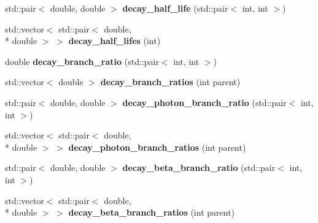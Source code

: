 \begin{DoxyCompactItemize}
\item 
\hypertarget{namespacepyne_acfa39b50f6a8d82e8a651df1f2802c91}{std\-::pair$<$ double, double $>$ {\bfseries decay\-\_\-half\-\_\-life} (std\-::pair$<$ int, int $>$)}\label{namespacepyne_acfa39b50f6a8d82e8a651df1f2802c91}

\item 
\hypertarget{namespacepyne_a107db9126709d0f3ccf56f198d4270a5}{std\-::vector$<$ std\-::pair$<$ double, \\*
double $>$ $>$ {\bfseries decay\-\_\-half\-\_\-lifes} (int)}\label{namespacepyne_a107db9126709d0f3ccf56f198d4270a5}

\item 
\hypertarget{namespacepyne_a9664752687deed520d438837982e7222}{double {\bfseries decay\-\_\-branch\-\_\-ratio} (std\-::pair$<$ int, int $>$)}\label{namespacepyne_a9664752687deed520d438837982e7222}

\item 
\hypertarget{namespacepyne_a14334fe7674faca75d40f5864b5fb1c1}{std\-::vector$<$ double $>$ {\bfseries decay\-\_\-branch\-\_\-ratios} (int parent)}\label{namespacepyne_a14334fe7674faca75d40f5864b5fb1c1}

\item 
\hypertarget{namespacepyne_a52dacedebd3759972e8eaba92415d6a6}{std\-::pair$<$ double, double $>$ {\bfseries decay\-\_\-photon\-\_\-branch\-\_\-ratio} (std\-::pair$<$ int, int $>$)}\label{namespacepyne_a52dacedebd3759972e8eaba92415d6a6}

\item 
\hypertarget{namespacepyne_a56c577e234113f0b8068882018072888}{std\-::vector$<$ std\-::pair$<$ double, \\*
double $>$ $>$ {\bfseries decay\-\_\-photon\-\_\-branch\-\_\-ratios} (int parent)}\label{namespacepyne_a56c577e234113f0b8068882018072888}

\item 
\hypertarget{namespacepyne_a2da9236f7356b5fd67adc01777af6769}{std\-::pair$<$ double, double $>$ {\bfseries decay\-\_\-beta\-\_\-branch\-\_\-ratio} (std\-::pair$<$ int, int $>$)}\label{namespacepyne_a2da9236f7356b5fd67adc01777af6769}

\item 
\hypertarget{namespacepyne_aef5ed08c65dbe62f9da6f7206772f7e5}{std\-::vector$<$ std\-::pair$<$ double, \\*
double $>$ $>$ {\bfseries decay\-\_\-beta\-\_\-branch\-\_\-ratios} (int parent)}\label{namespacepyne_aef5ed08c65dbe62f9da6f7206772f7e5}


\end{DoxyCompactItemize}
